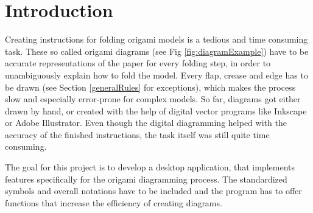 
\section{Introduction}
\label{sec:introduction}

Creating instructions for folding \gls{origami} models is a tedious and time consuming task. These so called origami diagrams (see Fig \ref{fig:diagramExample}) have to be accurate representations of the paper for every folding step, in order to unambiguously explain how to fold the model. Every flap, crease and edge has to be drawn (see Section \ref{generalRules} for exceptions), which makes the process slow and especially error-prone for complex models.
So far, diagrams got either drawn by hand, or created with the help of digital vector programs like Inkscape or Adobe Illustrator. Even though the digital diagramming helped with the accuracy of the finished instructions, the task itself was still quite time consuming.\cite{???}

The goal for this project is to develop a desktop application, that implements features specifically for the origami diagramming process. The standardized symbols and overall notations have to be included and the program has to offer functions that increase the efficiency of creating diagrams.